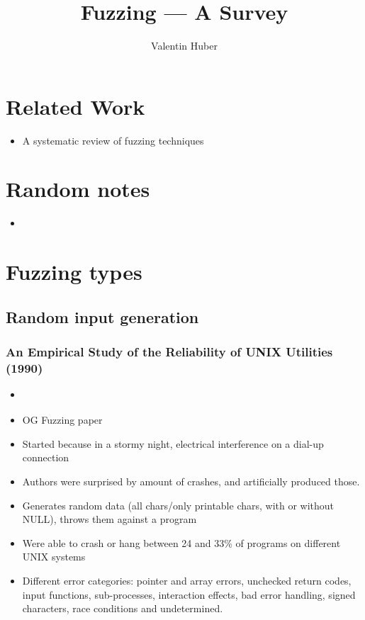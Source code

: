 \documentclass[12pt]{article}
\title{Fuzzing — A Survey}
\author{Valentin Huber}
\begin{document}


\maketitle
\tableofcontents

\section{Related Work}
\begin{itemize}
    \item A systematic review of fuzzing techniques\cite{Science}
\end{itemize}


\section{Random notes}
\begin{itemize}
    \item {}\cite{DART}
\end{itemize}

\section{Fuzzing types}
\subsection{Random input generation}
\subsubsection{An Empirical Study of the Reliability of UNIX Utilities (1990)}
\begin{itemize}
    \item \cite{UNIX}
    \item OG Fuzzing paper
    \item Started because in a stormy night, electrical interference on a dial-up connection
    \item Authors were surprised by amount of crashes, and artificially produced those.
    \item Generates random data (all chars/only printable chars, with or without NULL), throws them against a program
    \item Were able to crash or hang between 24 and 33\% of programs on different UNIX systems
    \item Different error categories: pointer and array errors, unchecked return codes, input functions, sub-processes, interaction effects, bad error handling, signed characters, race conditions and undetermined.
\end{itemize}
\end{document}
